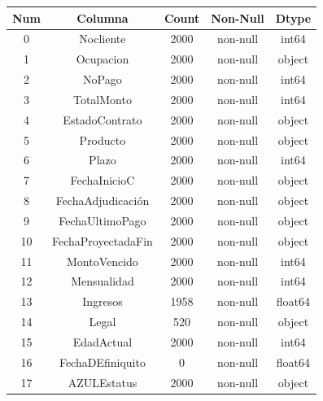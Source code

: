 \begin{table}[H]
    \centering
    
    \begin{tabular}{|c|c|c|c|c|}
        \hline
        \rowcolor{softblue} %
        \textbf{Num} & \textbf{Columna} & \textbf{Count} & \textbf{Non-Null} & \textbf{Dtype} \\
        \hline
        \hline
        0 &	Nocliente &		2000 &	non-null &	int64  \\
        \hline
        1 &	Ocupacion &		2000 &	non-null &	object \\
        \hline
        2 &  NoPago    &          2000 & non-null &  int64  \\
        \hline
        3 &  TotalMonto  &        2000 & non-null &  int64  \\
        \hline
        4 &  EstadoContrato &     2000 & non-null &  object \\
        \hline
        5 &   Producto  &         2000 & non-null &   object \\
        \hline
        6 &  Plazo     &          2000 & non-null &   int64  \\
        \hline
        7 &  FechaInicioC  &      2000 & non-null &   object \\
        \hline
        8 &  FechaAdjudicación &   2000 & non-null &   object \\
        \hline
        9 &   FechaUltimoPago &     2000 & non-null &   object \\
        \hline
        10 &  FechaProyectadaFin &  2000 & non-null &   object \\
        \hline
        11 &  MontoVencido &        2000 & non-null &   int64  \\
        \hline
        12 &  Mensualidad &         2000 & non-null &   int64  \\
        \hline
        \rowcolor{mediumgray}
        13 &  Ingresos &            1958 & non-null &   float64 \\
        \hline
        \rowcolor{mediumgray}
        14 &  Legal &               520 & non-null &    object \\
        \hline
        15 &  EdadActual &          2000 & non-null &   int64  \\
        \hline
        \rowcolor{mediumgray}
        16 &  FechaDEfiniquito &    0 & non-null &      float64 \\
        \hline
        17 &  AZULEstatus &         2000 & non-null &   object \\

\end{tabular}
\end{table}
